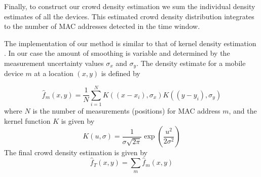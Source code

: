 \documentclass[10pt,a4paper]{article}
\begin{document}
Finally, to construct our crowd density estimation we sum the individual density estimates of all the devices.
This estimated crowd density distribution integrates to the number of MAC addresses detected in the time window.

The implementation of our method is similar to that of kernel density estimation \cite{scott}\cite{silverman}.
In our case the amount of smoothing is variable and determined by the measurement uncertainty values $\sigma_{x}$ and $\sigma_{y}$.
The density estimate for a mobile device $m$ at a location $(x,y)$ is defined by

\begin{equation}
\hat{f}_{m}(x,y)=\frac{1}{N}\sum_{i=1}^{N}K((x-x_{i}),\sigma_{x}) K((y-y_{i}),\sigma_{y})
\label{kde}
\end{equation}
where $N$ is the number of measurements (positions) for MAC address $m$, and the kernel function $K$ is given by
\begin{equation}
K(u,\sigma)=\frac{1}{\sigma\sqrt{2\pi}}\exp(\frac{u^2}{2\sigma^2})
\end{equation}
The final crowd density estimation is given by
\begin{equation}
\hat{f}_{T}(x,y)=\sum_{m}\hat{f}_{m}(x,y)
\label{total}
\end{equation}

\end{document}

